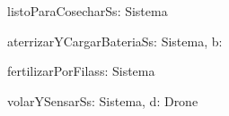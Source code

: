 \begin{problema}{listoParaCosecharS}{s: Sistema}{\bool}
\end{problema}

\begin{problema}{aterrizarYCargarBateriaS}{s: Sistema, b: \ent}{}
\end{problema}

\begin{problema}{fertilizarPorFilas}{s: Sistema}{}
\end{problema}

\begin{problema}{volarYSensarS}{s: Sistema, d: Drone}{}
\end{problema}
